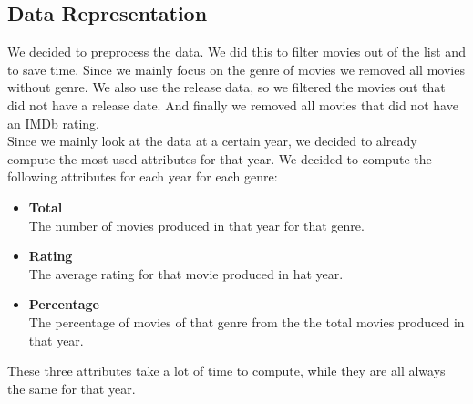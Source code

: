 	\subsection{Data Representation}
	We decided to preprocess the data. We did this to filter movies out of the list and to save time.
	Since we mainly focus on the genre of movies we removed all movies without genre.
	We also use the release data, so we filtered the movies out that did not have a release date.
	And finally we removed all movies that did not have an IMDb rating. \\
	Since we mainly look at the data at a certain year, we decided to already compute the most used attributes for that year.
	We decided to compute the following attributes for each year for each genre:
	\begin{itemize}
	\item \textbf{Total}\\
	The number of movies produced in that year for that genre.
	\item \textbf{Rating} \\
	The average rating for that movie produced in hat year.
	\item \textbf{Percentage} \\
	The percentage of movies of that genre from the the total movies produced in that year.
	\end{itemize}
	These three attributes take a lot of time to compute, while they are all always the same for that year. 

	